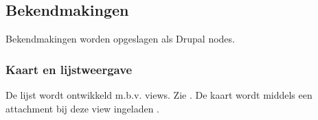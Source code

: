 \subsection{Bekendmakingen}\label{bekendmakingen}

Bekendmakingen worden opgeslagen als Drupal nodes.

\subsubsection{Kaart en lijstweergave}\label{bekendmakingen-op-de-kaart}

De lijst wordt ontwikkeld m.b.v. views. Zie . De kaart wordt middels een attachment bij deze view ingeladen .
